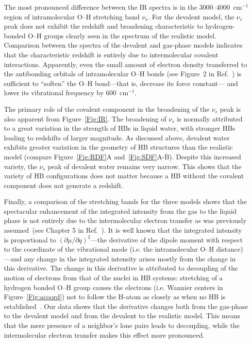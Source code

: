 \documentclass[journal=jacsat,manuscript=article]{achemso}
\begin{document}
The most pronounced difference between the IR spectra is in the 3000--4000~cm$^{-1}$ region of intramolecular O--H stretching band $\nu_s$. 
For the devalent model, the $\nu_s$ peak does not exhibit the redshift and broadening characteristic to hydrogen-bonded O--H groups clearly seen in the spectrum of the realistic model. 
Comparison between the spectra of the devalent and gas-phase models indicates that the characteristic redshift is entirely due to intermolecular covalent interactions. 
Apparently, even the small amount of electron density transferred to the antibonding orbitals of intramolecular O--H bonds (see Figure~2 in Ref.~) is sufficient to ``soften'' the O--H bond---that is, decrease its force constant--- and lower its vibrational frequency by 600~cm$^{-1}$.

The primary role of the covalent component in the broadening of the $\nu_s$ peak is also apparent from Figure~\ref{Fig:IR}. 
The broadening of $\nu_s$ is normally attributed to a great variation in the strength of HBs in liquid water, with stronger HBs leading to redshifts of larger magnitude. 
As discussed above, devalent water exhibits greater variation in the geometry of HB structures than the realistic model (compare Figure~\ref{Fig:RDF}A and~\ref{Fig:SDF}A-B). 
Despite this increased variety, the $\nu_s$ peak of devalent water remains very narrow. This shows that the variety of HB configurations does not matter because a HB without the covalent component does not generate a redshift. 


Finally, a comparison of the stretching bands for the three models shows that the spectacular enhancement of the integrated intensity from the gas to the liquid phase is not entirely due to the intermolecular electron transfer as was previously assumed~(see Chapter 5 in Ref.~). 
It is well known that the integrated intensity is proportional to $\left({\partial \mu}/{\partial q}\right)^2$---the derivative of the dipole moment with respect to the coordinate of the vibrational mode (i.e. the intramolecular O--H distance)---and any change in the integrated intensity arises mostly from the change in this derivative. 
The change in this derivative is attributed to decoupling of the motion of electrons from that of the nuclei in HB systems: stretching of a hydrogen bonded O--H group causes the electrons (i.e. Wannier centers in Figure~\ref{Fig:acoord}) not to follow the H-atom as closely as when no HB is established~\cite{marechal2006hydrogen}. 
Our data shows that the derivative changes both from the gas-phase to the devalent model and from the devalent to the realistic model. 
This means that the mere presence of a neighbor's lone pairs leads to decoupling, while the intermolecular electron transfer makes this effect more pronounced.
\end{document}
